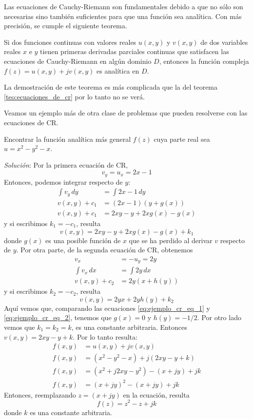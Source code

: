 Las ecuaciones de Cauchy-Riemann son fundamentales debido a que no sólo son necesarias sino también suficientes para que una función sea analítica. Con más precisión, se cumple el siguiente teorema.

\begin{theorem}
  Si dos funciones continuas con valores reales $u(x,y)$ y $v(x,y)$ de dos variables reales $x$ e $y$ tienen primeras derivadas parciales continuas que satisfacen las ecuaciones de Cauchy-Riemann en algún dominio $D$, entonces la función compleja $f(z)=u(x,y)+jv(x,y)$ es analítica en $D$.
\end{theorem}

La demostración de este teorema es más complicada que la del teorema \ref{teo:ecuaciones_de_cr} por lo tanto no se verá.

Veamos un ejemplo más de otra clase de problemas que pueden resolverse con las ecuaciones de CR.
\begin{example}
  Encontrar la función analítica más general $f(z)$ cuya parte real sea $u=x^2-y^2-x$.

  \textit{Solución}: Por la primera ecuación de CR,
  \[
    v_y = u_x = 2x-1
  \]
  Entonces, podemos integrar respecto de $y$:
  \begin{align*}
    \int v_y \, dy &= \int 2x -1 \, dy \\ 
    v(x,y) + c_1 &= (2x-1)(y+g(x)) \\ 
    v(x,y) + c_1 &= 2xy - y + 2xg(x) - g(x) 
  \end{align*}
  y si escribimos $k_1=-c_1$, resulta
  \begin{equation}\label{eq:ejemplo_cr_eq_1}
    v(x,y) = 2xy - y + 2xg(x) - g(x) + k_1
  \end{equation}
  donde $g(x)$ es una posible función de $x$ que se ha perdido al derivar $v$ respecto de $y$. Por otra parte, de la segunda ecuación de CR, obtenemos
  \begin{align*}
    v_x &= -u_y = 2y \\ 
    \int v_x \,dx &= \int 2y \, dx \\ 
    v(x,y) + c_2 &= 2y (x + h(y)) 
  \end{align*}
  y si escribimos $k_2=-c_2$, resulta
  \begin{equation}\label{eq:ejemplo_cr_eq_2}
    v(x,y) = 2yx + 2yh(y) + k_2
  \end{equation}
  Aquí vemos que, comparando las ecuaciones \ref{eq:ejemplo_cr_eq_1} y \ref{eq:ejemplo_cr_eq_2}, tenemos que $g(x)=0$ y $h(y)=-1/2$. Por otro lado vemos que $k_1 = k_2 = k$, es una constante arbitraria. Entonces $v(x,y)=2xy - y + k$. Por lo tanto resulta:
  \begin{align*}
    f(x,y) &= u(x,y) + jv(x,y) \\ 
    f(x,y) &= (x^2-y^2-x) + j(2xy - y + k) \\ 
    f(x,y) &= (x^2 + j2xy - y^2) - (x+jy) + jk \\ 
    f(x,y) &= (x+jy)^2 - (x+jy) + jk
  \end{align*}
  Entonces, reemplazando $z=(x+jy)$ en la ecuación, resulta
  \[
    \boxed{f(z) = z^2 - z + jk}
  \]
  donde $k$ es una constante arbitraria.
\end{example}

